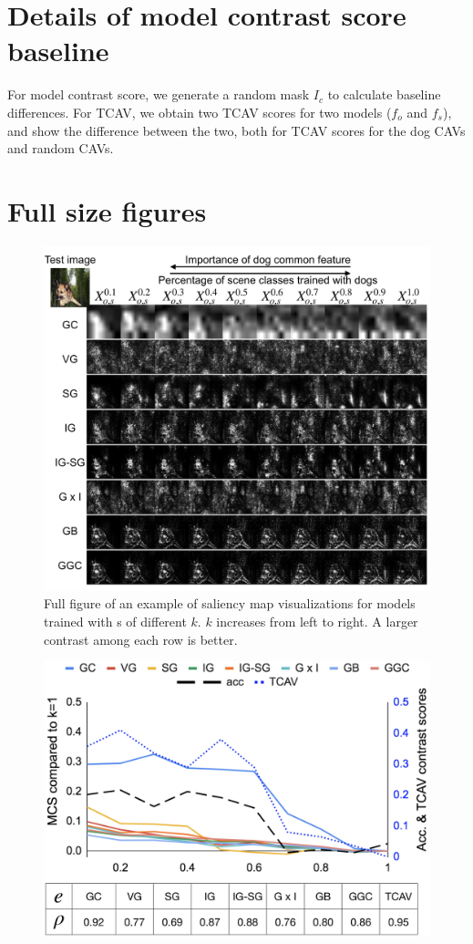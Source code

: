 \begin{appendix}
\section{Details of model contrast score baseline}
For model contrast score, we generate a random mask $I_c$ to calculate baseline differences. For TCAV, we obtain two TCAV scores for two models ($f_o$ and $f_s$), and show the difference between the two, both for TCAV scores for the dog CAVs and random CAVs. 

\section{Full size figures}%

\begin{figure}
  \includegraphics[width=1.\linewidth]{figures/rmc_demo.jpg}
  \caption{Full figure of an example of saliency map visualizations for models trained with \CF s of different $k$. $k$ increases from left to right. A larger contrast among each row is better.}
\end{figure}
\begin{figure}
  \includegraphics[width=1.\linewidth]{figures/rmc_chart.jpg}

\end{figure}
\end{appendix}
